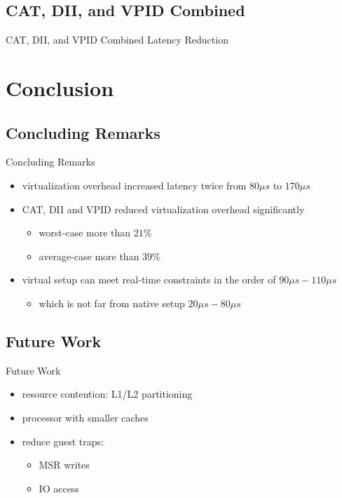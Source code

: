 \documentclass[10pt,hyperref={hyperfootnotes=false}, xcolor={usenames, dvipsnames}]{beamer}
\begin{document}
\subsection{CAT, DII, and VPID Combined}
\begin{frame}[allowframebreaks]{CAT, DII, and VPID Combined} {Latency Reduction}
	
\end{frame}

\section{Conclusion}
\subsection{Concluding Remarks}
\begin{frame}{Concluding Remarks}
  \begin{itemize}
  \item {virtualization overhead increased latency twice {from $80\mu{}s$ to $170\mu{}s$}} \pause{}
  \item {CAT, DII and VPID reduced virtualization overhead significantly}  \pause{}
		\begin{itemize}
			\item{worst-case more than $21$\%}  \pause{}
			\item{average-case more than $39$\%}  \pause{}
		\end{itemize}
  \item {virtual setup can meet real-time constraints in the order of $90\mu{}s-110\mu{}s$} \pause{}
	  	\begin{itemize}
	     	\item {which is not far from native setup  $20\mu{}s-80\mu{}s$}
		\end{itemize}
  \end{itemize}
\end{frame}
\subsection{Future Work}
\begin{frame}{Future Work}
  \begin{itemize}
	\item {resource contention: L1/L2 partitioning} \pause{}
	\item {processor with smaller caches} \pause{}
    \item {reduce guest traps:} 
		  \begin{itemize}
			\item {MSR writes} \pause{}
			\item {IO access}
		  \end{itemize}
  \end{itemize}
\end{frame}
\end{document}
